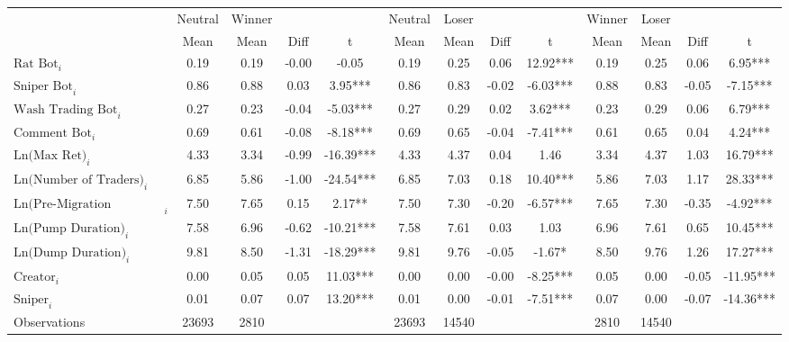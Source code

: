 \begin{tabular}{lcccccccccccc}
\hline
& Neutral & Winner & & & Neutral & Loser & & & Winner & Loser & & \\
\cline{2-13}
& Mean & Mean & Diff & t & Mean & Mean & Diff & t & Mean & Mean & Diff & t \\
\hline
$\text{Rat Bot}_{i}$ & 0.19 & 0.19 & -0.00 & -0.05 & 0.19 & 0.25 & 0.06 & 12.92*** & 0.19 & 0.25 & 0.06 & 6.95*** \\
$\text{Sniper Bot}_{i}$ & 0.86 & 0.88 & 0.03 & 3.95*** & 0.86 & 0.83 & -0.02 & -6.03*** & 0.88 & 0.83 & -0.05 & -7.15*** \\
$\text{Wash Trading Bot}_{i}$ & 0.27 & 0.23 & -0.04 & -5.03*** & 0.27 & 0.29 & 0.02 & 3.62*** & 0.23 & 0.29 & 0.06 & 6.79*** \\
$\text{Comment Bot}_{i}$ & 0.69 & 0.61 & -0.08 & -8.18*** & 0.69 & 0.65 & -0.04 & -7.41*** & 0.61 & 0.65 & 0.04 & 4.24*** \\
$\text{Ln(Max Ret)}_{i}$ & 4.33 & 3.34 & -0.99 & -16.39*** & 4.33 & 4.37 & 0.04 & 1.46 & 3.34 & 4.37 & 1.03 & 16.79*** \\
$\text{Ln(Number of Traders)}_{i}$ & 6.85 & 5.86 & -1.00 & -24.54*** & 6.85 & 7.03 & 0.18 & 10.40*** & 5.86 & 7.03 & 1.17 & 28.33*** \\
$\text{Ln(Pre-Migration Duration)}_{i}$ & 7.50 & 7.65 & 0.15 & 2.17** & 7.50 & 7.30 & -0.20 & -6.57*** & 7.65 & 7.30 & -0.35 & -4.92*** \\
$\text{Ln(Pump Duration)}_{i}$ & 7.58 & 6.96 & -0.62 & -10.21*** & 7.58 & 7.61 & 0.03 & 1.03 & 6.96 & 7.61 & 0.65 & 10.45*** \\
$\text{Ln(Dump Duration)}_{i}$ & 9.81 & 8.50 & -1.31 & -18.29*** & 9.81 & 9.76 & -0.05 & -1.67* & 8.50 & 9.76 & 1.26 & 17.27*** \\
$\text{Creator}_{i}$ & 0.00 & 0.05 & 0.05 & 11.03*** & 0.00 & 0.00 & -0.00 & -8.25*** & 0.05 & 0.00 & -0.05 & -11.95*** \\
$\text{Sniper}_{i}$ & 0.01 & 0.07 & 0.07 & 13.20*** & 0.01 & 0.00 & -0.01 & -7.51*** & 0.07 & 0.00 & -0.07 & -14.36*** \\
\hline
Observations & 23693 & 2810 & & & 23693 & 14540 & & & 2810 & 14540 & & \\
\hline
\end{tabular}